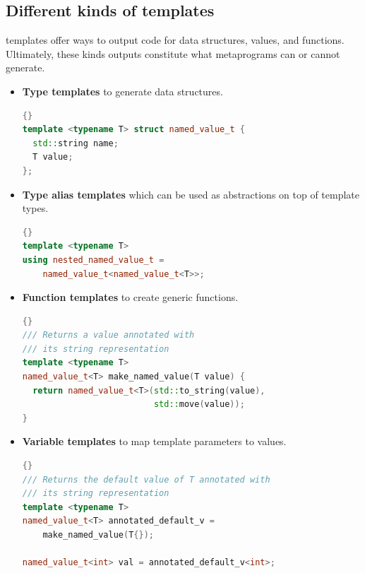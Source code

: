 \documentclass[../main]{subfiles}
\begin{document}
\subsection{
  Different kinds of templates
}

\cpp templates offer ways to output code for data structures, values,
and functions. Ultimately, these kinds outputs constitute what metaprograms
can or cannot generate.

\begin{itemize}

  \item

\textbf{Type templates} to generate data structures.

\begin{lstlisting}[language=c++]{}
template <typename T> struct named_value_t {
  std::string name;
  T value;
};
\end{lstlisting}

  \item

\textbf{Type alias templates} which can be used as abstractions on top of
template types.

\begin{lstlisting}[language=c++]{}
template <typename T>
using nested_named_value_t =
    named_value_t<named_value_t<T>>;
\end{lstlisting}

  \item

\textbf{Function templates} to create generic functions.

\begin{lstlisting}[language=c++]{}
/// Returns a value annotated with
/// its string representation
template <typename T>
named_value_t<T> make_named_value(T value) {
  return named_value_t<T>(std::to_string(value),
                          std::move(value));
}
\end{lstlisting}

  \item

\textbf{Variable templates} to map template parameters to values.

\begin{lstlisting}[language=c++]{}
/// Returns the default value of T annotated with
/// its string representation
template <typename T>
named_value_t<T> annotated_default_v =
    make_named_value(T{});

named_value_t<int> val = annotated_default_v<int>;
\end{lstlisting}

\end{itemize}
\end{document}

